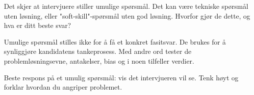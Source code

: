 

Det skjer at intervjuere stiller umulige spørsmål. Det kan være tekniske spørsmål uten løsning, eller "soft-skill"-spørsmål uten god løsning. Hvorfor gjør de dette, og hva er ditt beste svar?

\vskip 50pt







Umulige spørsmål stilles ikke for å få et konkret fasitsvar. De brukes for å synliggjøre kandidatens tankeprosess. Med andre ord tester de problemløsningsevne, antakelser, bias og i noen tilfeller verdier.







Beste respons på et umulig spørsmål: vis det intervjueren vil se. Tenk høyt og forklar hvordan du angriper problemet.


